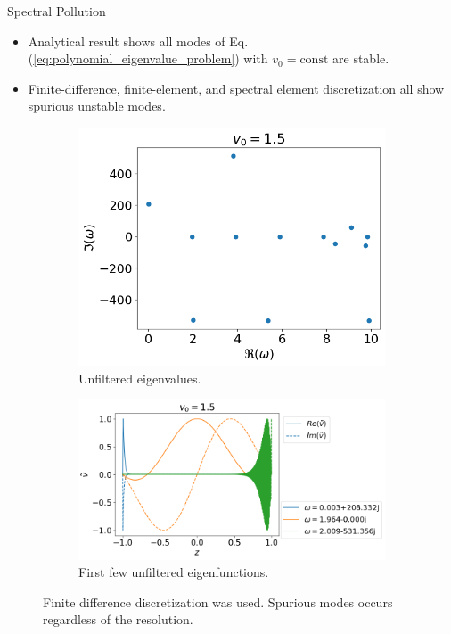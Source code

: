 \begin{frame}{Spectral Pollution}
  \begin{itemize}
    \item Analytical result shows all modes of Eq.(\ref{eq:polynomial_eigenvalue_problem}) with $v_0=\text{const}$ are stable.
    \item Finite-difference, finite-element, and spectral element discretization all show spurious unstable modes.
  \end{itemize}
  \begin{figure}[htbp]	
    \centering
    \begin{subfigure}[b]{0.4\linewidth}
      \includegraphics[width=\linewidth]{figures/eigvals-bad} 
      \caption{Unfiltered eigenvalues.}
    \end{subfigure}%
    \begin{subfigure}[b]{0.6\linewidth}
      \includegraphics[width=\linewidth]{figures/eigvecs-bad} 
      \caption{First few unfiltered eigenfunctions.}
    \end{subfigure}
    \caption{Finite difference discretization was used. Spurious modes occurs regardless of the resolution.}
    \label{fig:results-bad}
  \end{figure}
\end{frame} 

